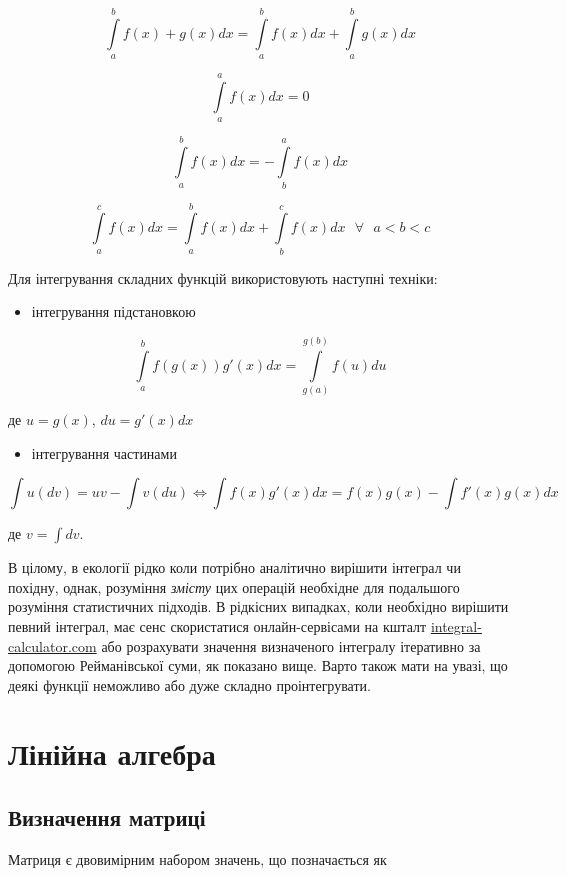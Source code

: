 \documentclass[
  11pt,
]{book}
\providecommand{\tightlist}{%
  \setlength{\itemsep}{0pt}\setlength{\parskip}{0pt}}
\begin{document}
\[\int \limits_a^b f(x) + g(x) dx = \int \limits_a^b f(x) dx + \int \limits_a^b g(x) dx\]

\[\int \limits_a^a f(x)dx = 0\]

\[\int \limits_a^b f(x)dx = -\int \limits_b^a f(x)dx\]

\[\int \limits_a^c f(x)dx = \int \limits_a^b f(x)dx + \int \limits_b^c f(x)dx \text{ } \forall \text{ } a < b < c\]

Для інтегрування складних функцій використовують наступні техніки:

\begin{itemize}
\tightlist
\item
  інтегрування підстановкою
\end{itemize}

\[\int \limits_a^b f(g(x)) g'(x)dx = \int \limits_{g(a)}^{g(b)} f(u) du\]

де \(u = g(x)\), \(du = g'(x)dx\)

\begin{itemize}
\tightlist
\item
  інтегрування частинами
\end{itemize}

\[\int u (dv) = uv - \int v (du) \iff \int f(x)g'(x)dx = f(x)g(x) - \int f'(x) g(x) dx\]

де \(v = \int dv\).

В цілому, в екології рідко коли потрібно аналітично вирішити інтеграл чи
похідну, однак, розуміння \emph{змісту} цих операцій необхідне для
подальшого розуміння статистичних підходів. В рідкісних випадках, коли
необхідно вирішити певний інтеграл, має сенс скористатися
онлайн-сервісами на кшталт
\href{https://www.integral-calculator.com/}{integral-calculator.com} або
розрахувати значення визначеного інтегралу ітеративно за допомогою
Рейманівської суми, як показано вище. Варто також мати на увазі, що
деякі функції неможливо або дуже складно проінтегрувати.

\section{Лінійна алгебра}\label{matrices}

\subsection{Визначення
матриці}\label{ux432ux438ux437ux43dux430ux447ux435ux43dux43dux44f-ux43cux430ux442ux440ux438ux446ux456}

Матриця є двовимірним набором значень, що позначається як
\end{document}
